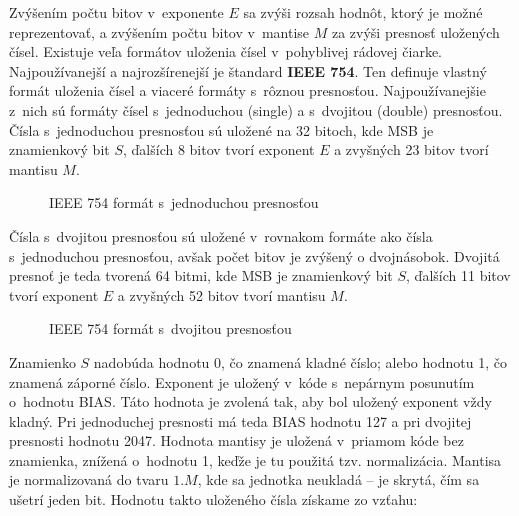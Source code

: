 Zvýšením počtu bitov v~exponente $ E $ sa zvýši rozsah hodnôt, ktorý je možné reprezentovať, a zvýšením počtu bitov v~mantise $ M $ za zvýši presnosť uložených čísel. Existuje veľa formátov uloženia čísel v~pohyblivej rádovej čiarke. Najpoužívanejší a najrozšírenejší je štandard \textbf{IEEE 754}. Ten definuje vlastný formát uloženia čísel a viaceré formáty s~rôznou presnosťou. Najpoužívanejšie z~nich sú formáty čísel s~jednoduchou (single) a s~dvojitou (double) presnosťou. Čísla s~jednoduchou presnosťou sú uložené na 32 bitoch, kde MSB je znamienkový bit $ S $, ďalších 8 bitov tvorí exponent $ E $ a zvyšných 23 bitov tvorí mantisu $ M $.

\bigskip
\begin{figure}[h]
\centering
{}
\caption{IEEE 754 formát s~jednoduchou presnosťou}
\label{formatFP32}
\end{figure}


Čísla s~dvojitou presnosťou sú uložené v~rovnakom formáte ako čísla s~jednoduchou presnosťou, avšak počet bitov je zvýšený o dvojnásobok. Dvojitá presnoť je teda tvorená 64 bitmi, kde MSB je znamienkový bit $ S $, ďalších 11 bitov tvorí exponent $ E $ a zvyšných 52 bitov tvorí mantisu $ M $.

\bigskip
\begin{figure}[h]
\centering
{}
\caption{IEEE 754 formát s~dvojitou presnosťou}
\label{formatFP64}
\end{figure}

Znamienko $ S $ nadobúda hodnotu 0, čo znamená kladné číslo; alebo hodnotu 1, čo znamená záporné číslo. Exponent je uložený v~kóde s~nepárnym posunutím o~hodnotu BIAS. Táto hodnota je zvolená tak, aby bol uložený exponent vždy kladný. Pri jednoduchej presnosti má teda BIAS hodnotu 127 a pri dvojitej presnosti hodnotu 2047.
\newpage
Hodnota mantisy je uložená v~priamom kóde bez znamienka, znížená o~hodnotu 1, keďže je tu použitá tzv. normalizácia. Mantisa je normalizovaná do tvaru $ 1.M $, kde sa jednotka neukladá -- je skrytá, čím sa ušetrí jeden bit. Hodnotu takto uloženého čísla získame zo vzťahu:

